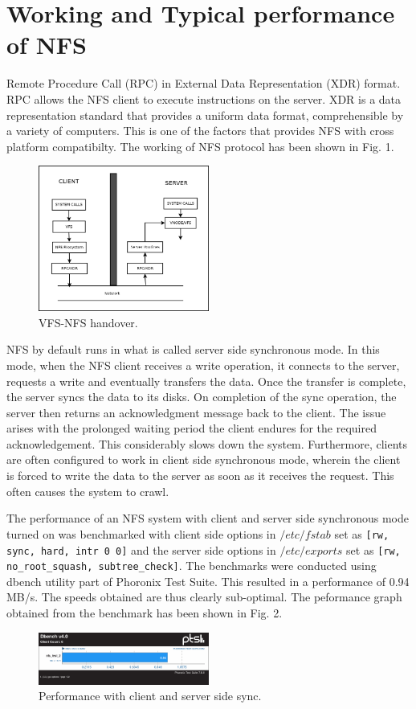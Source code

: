 \documentclass[conference]{IEEEtran}
\begin{document}
\section{Working and Typical performance of NFS}
Remote Procedure Call (RPC) in External Data Representation (XDR) format.
RPC allows the NFS client to execute instructions on the server. XDR is a
data representation standard that provides a uniform data format, comprehensible
by a variety of computers. This is one of the factors that provides NFS with
cross platform compatibilty. The working of NFS protocol has been shown in 
Fig. 1.
\begin{figure}[htbp]
\centerline{\includegraphics[width=0.5\textwidth,natwidth=400,natheight=300]{Diagram1.png}}
\caption{VFS-NFS handover.}
\label{fig}
\end{figure}
NFS by default runs in what is called server side synchronous mode. In this
mode, when the NFS client receives a write operation, it connects to the
server, requests a write and eventually transfers the data. Once the transfer is
complete, the server syncs the data to its disks. On completion of the sync
operation, the server then returns an acknowledgment message back to the client.
The issue arises with the prolonged waiting period the client endures for the
required acknowledgement. This considerably slows down the system.
Furthermore, clients are often configured to work in client side synchronous
mode, wherein the client is forced to write the data to the server as soon
as it receives the request. This often causes the system to crawl.

The performance of an NFS system with client and server side synchronous
mode turned on was benchmarked with client side options in $/etc/fstab$ set as
\texttt{[rw, sync, hard, intr 0 0]} and the server side options  in $/etc/exports$ set
as \texttt{[rw, no\_root\_squash, subtree\_check]}. The benchmarks were conducted using
dbench utility part of Phoronix Test Suite. This resulted in a performance
of 0.94 MB/s. The speeds obtained are thus clearly sub-optimal. The
peformance graph obtained from the benchmark has been shown in Fig. 2.
\begin{figure}[htbp]
\centerline{\includegraphics[width=0.5\textwidth,natwidth=400,natheight=50]{nfs_working_fig_2.png}}
\caption{Performance with client and server side sync.}
\label{fig}
\end{figure}
\end{document}
